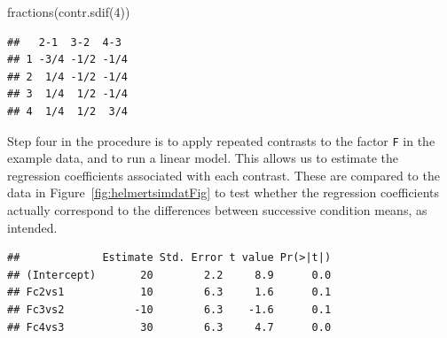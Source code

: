 \documentclass[
  12pt,
]{krantz}
\newenvironment{Shaded}{\begin{snugshade}}{\end{snugshade}}
\newcommand{\AttributeTok}[1]{\textcolor[rgb]{0.77,0.63,0.00}{#1}}
\newcommand{\DecValTok}[1]{\textcolor[rgb]{0.00,0.00,0.81}{#1}}
\newcommand{\FunctionTok}[1]{\textcolor[rgb]{0.00,0.00,0.00}{#1}}
\newcommand{\NormalTok}[1]{#1}
\newcommand{\OtherTok}[1]{\textcolor[rgb]{0.56,0.35,0.01}{#1}}
\newcommand{\SpecialCharTok}[1]{\textcolor[rgb]{0.00,0.00,0.00}{#1}}
\theoremstyle{definition}
\theoremstyle{definition}
\theoremstyle{definition}
\theoremstyle{definition}
\theoremstyle{remark}
\begin{document}
\begin{Shaded}
\begin{Highlighting}[]
\FunctionTok{fractions}\NormalTok{(}\FunctionTok{contr.sdif}\NormalTok{(}\DecValTok{4}\NormalTok{))}
\end{Highlighting}
\end{Shaded}

\begin{verbatim}
##   2-1  3-2  4-3 
## 1 -3/4 -1/2 -1/4
## 2  1/4 -1/2 -1/4
## 3  1/4  1/2 -1/4
## 4  1/4  1/2  3/4
\end{verbatim}

Step four in the procedure is to apply repeated contrasts to the factor \texttt{F} in the example data, and to run a linear model. This allows us to estimate the regression coefficients associated with each contrast. These are compared to the data in Figure~\ref{fig:helmertsimdatFig} to test whether the regression coefficients actually correspond to the differences between successive condition means, as intended.

\begin{Shaded}
\end{Shaded}

\begin{Shaded}
\end{Shaded}

\begin{verbatim}
##             Estimate Std. Error t value Pr(>|t|)
## (Intercept)       20        2.2     8.9      0.0
## Fc2vs1            10        6.3     1.6      0.1
## Fc3vs2           -10        6.3    -1.6      0.1
## Fc4vs3            30        6.3     4.7      0.0
\end{verbatim}
\end{document}
